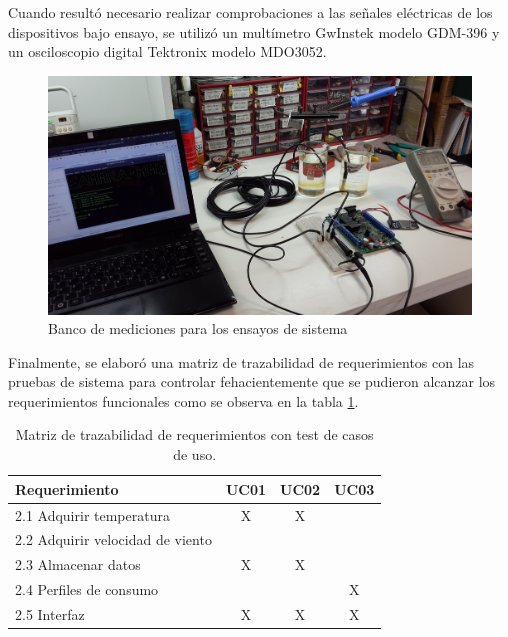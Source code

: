 Cuando resultó necesario realizar comprobaciones a las señales eléctricas de los dispositivos bajo ensayo, se utilizó un multímetro GwInstek modelo GDM-396 y un osciloscopio digital Tektronix modelo MDO3052.
\vspace{5px}
\begin{figure}[!htb]
	\centering
	\includegraphics[width=1\textwidth]{./Figures/banco.jpg}
	\caption{Banco de mediciones para los ensayos de sistema}
	\label{fig:banco}
\end{figure}
\vspace{5px}
Finalmente, se elaboró una matriz de trazabilidad de requerimientos con las pruebas de sistema para controlar fehacientemente que se pudieron alcanzar los requerimientos funcionales como se observa en la tabla \ref{tab:trazabilidad_test}. 
\vspace{5px}
\begin{table}[ht]
\centering
\caption{Matriz de trazabilidad de requerimientos con test de casos de uso.}
\label{tab:trazabilidad_test}
\begin{tabular}{lccc}
\toprule
\textbf{Requerimiento}					   & \textbf{UC01} 	  & \textbf{UC02}  & \textbf{UC03}  \\ \midrule
2.1 Adquirir temperatura                   & X                & X              &    		 	\\ %
2.2 Adquirir velocidad de viento           &                  &                &   		  		\\ %
2.3 Almacenar datos                        & X                & X              &      			\\ %
2.4 Perfiles de consumo                    &                  &                & X    			\\ %
2.5 Interfaz                               & X                & X              & X    			\\ 
\bottomrule
\end{tabular}
\end{table}

